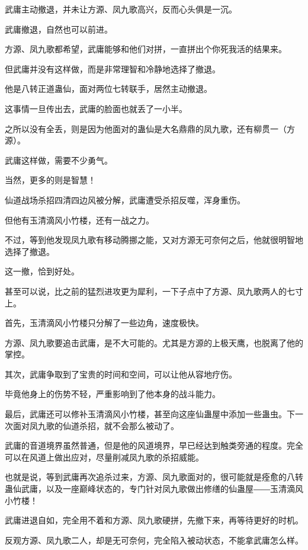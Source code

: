 
\begin{this_body}

武庸主动撤退，并未让方源、凤九歌高兴，反而心头俱是一沉。

武庸撤退，自然也可以前进。

方源、凤九歌都希望，武庸能够和他们对拼，一直拼出个你死我活的结果来。

但武庸并没有这样做，而是非常理智和冷静地选择了撤退。

他是八转正道蛊仙，面对两位七转联手，居然主动撤退。

这事情一旦传出去，武庸的脸面也就丢了一小半。

之所以没有全丢，则是因为他面对的蛊仙是大名鼎鼎的凤九歌，还有柳贯一（方源）。

武庸这样做，需要不少勇气。

当然，更多的则是智慧！

仙道战场杀招四清四边风被分解，武庸遭受杀招反噬，浑身重伤。

但他有玉清滴风小竹楼，还有一战之力。

不过，等到他发现凤九歌有移动腾挪之能，又对方源无可奈何之后，他就很明智地选择了撤退。

这一撤，恰到好处。

甚至可以说，比之前的猛烈进攻更为犀利，一下子点中了方源、凤九歌两人的七寸上。

首先，玉清滴风小竹楼只分解了一些边角，速度极快。

方源、凤九歌要追击武庸，是不大可能的。尤其是方源的上极天鹰，也脱离了他的掌控。

其次，武庸争取到了宝贵的时间和空间，可以让他从容地疗伤。

毕竟他身上的伤势不轻，严重影响到了他本身的战斗能力。

最后，武庸还可以修补玉清滴风小竹楼，甚至向这座仙蛊屋中添加一些蛊虫。下一次面对凤九歌的仙道杀招，就不会那么被动了。

武庸的音道境界虽然普通，但是他的风道境界，早已经达到触类旁通的程度。完全可以在风道上做出应对，尽量削减凤九歌的杀招威能。

也就是说，等到武庸再次追杀过来，方源、凤九歌面对的，很可能就是痊愈的八转蛊仙武庸，以及一座巅峰状态的，专门针对凤九歌做出修缮的仙蛊屋――玉清滴风小竹楼！

武庸进退自如，完全用不着和方源、凤九歌硬拼，先撤下来，再等待更好的时机。

反观方源、凤九歌二人，却是无可奈何，完全陷入被动状态，不能拿武庸怎么样。


\end{this_body}
